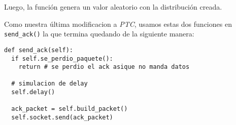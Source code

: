 Luego, la funci\'on  genera un valor aleatorio con la distribuci\'on creada.  

Como nuestra \'ultima modificacion a \emph{PTC}, usamos estas dos funciones en \texttt{send\_ack()} la que termina quedando de la siguiente manera:

\begin{verbatim}
def send_ack(self):
  if self.se_perdio_paquete():
    return # se perdio el ack asique no manda datos

  # simulacion de delay
  self.delay()

  ack_packet = self.build_packet()
  self.socket.send(ack_packet)
\end{verbatim}